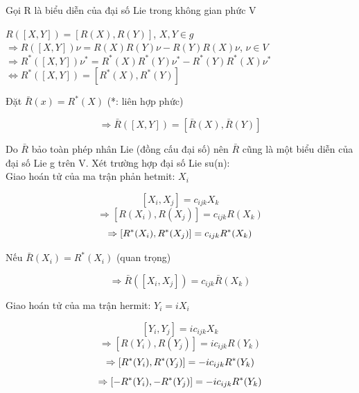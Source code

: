 \documentclass{report}
\begin{document}
Gọi R là biểu diễn của đại số Lie trong không gian phức V

	\begin{center}
		\( R \left( \left[ X, Y \right] \right) = \left[ R(X), R(Y) \right] \), \hspace*{0.5cm} \( X, Y \in g \) \\
		
		\( \Rightarrow R \left( \left[ X, Y \right] \right) \nu = R(X)R(Y) \nu - R(Y)R(X) \nu \), \hspace*{0.5cm} \( \nu \in V \) \\
		
		\( \Rightarrow R^{*} \left( \left[ X, Y \right] \right) \nu^{*} = R^{*}(X)R^{*}(Y) \nu^{*} - R^{*}(Y)R^{*}(X) \nu^{*} \) \\
		
		\( \Leftrightarrow R^{*} \left( \left[ X, Y \right] \right) = \left[ R^{*}(X), R^{*}(Y) \right] \)
	\end{center}
	
Đặt \( \bar{R}(x) = R^{*}(X) \) (*: liên hợp phức)	

\[ \Rightarrow \bar{R} \left( \left[ X, Y \right] \right) = \left[ \bar{R}(X), \bar{R}(Y) \right] \]

Do \( \bar{R} \) bảo toàn phép nhân Lie (đồng cấu đại số) nên  \( \bar{R} \) cũng là một biểu diễn của đại số Lie g trên V. Xét trường hợp đại số Lie su(n):\\

Giao hoán tử của ma trận phản hetmit: \( X_{i} \)

\[ \left[ X_{i}, X_{j} \right] = c_{ijk} X_{k} \]
\[ \Rightarrow \left[ R(X_{i}), R(X_{j}) \right] = c_{ijk} R(X_{k}) \]
\[ \Rightarrow\left[ R^{*}(X_{i}), R^{*}(X_{j}) \right] = c_{ijk} \\ R^{*}(X_{k}) \]

\hspace*{0.5cm} Nếu \( \bar{R}(X_{i}) = R^{*}(X_{i}) \) (quan trọng)

\[ \Rightarrow \bar{R}( \left[ X_{i}, X_{j} \right] ) = c_{ijk} \bar{R}(X_{k}) \]

Giao hoán tử của ma trận hermit: \( Y_{i} = i X_{i} \)

\[ \left[ Y_{i}, Y_{j} \right] = i c_{ijk} X_{k} \]
\[ \Rightarrow \left[ R(Y_{i}), R(Y_{j}) \right] = i c_{ijk} R(Y_{k}) \]
\[ \Rightarrow\left[ R^{*}(Y_{i}), R^{*}(Y_{j}) \right] = -i c_{ijk} \\ R^{*}(Y_{k}) \]
\[ \Rightarrow\left[ - R^{*}(Y_{i}), - R^{*}(Y_{j}) \right] = -i c_{ijk} \\ R^{*}(Y_{k}) \]
\end{document}
